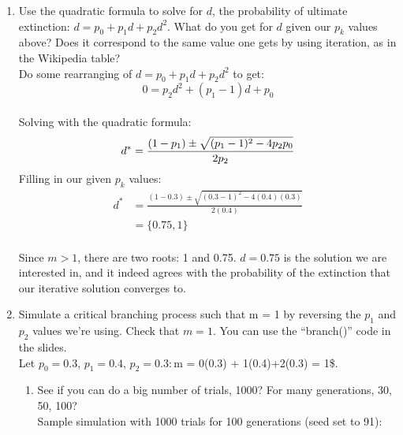 \documentclass[]{book}
\providecommand{\tightlist}{%
  \setlength{\itemsep}{0pt}\setlength{\parskip}{0pt}}
\begin{document}
\begin{enumerate}
\def\labelenumi{\arabic{enumi}.}
\setcounter{enumi}{3}
\tightlist
\item
  Use the quadratic formula to solve for \(d\), the probability of ultimate extinction: \(d = p_0 + p_1d + p_2d^2\). What do you get for \(d\) given our \(p_k\) values above? Does it correspond to the same value one gets by using iteration, as in the Wikipedia table?\\
  Do some rearranging of \(d = p_0 + p_1d + p_2d^2\) to get: \[0 = p_2d^2 +(p_1-1)d + p_0  \]\\
  Solving with the quadratic formula: \[ d^* = {(1-p_1) \pm \sqrt{(p_1-1)^2 - 4p_2p_0}  \over 2p_2 } \]
  Filling in our given \(p_k\) values:
  \[\begin{aligned}
   d^* &= \frac{(1-0.3) \pm \sqrt{(0.3-1)^2 -4(0.4)(0.3)}}{2(0.4)} \\
   &= \{0.75, 1\} 
   \end{aligned}\]\\
  Since \(m>1\), there are two roots: 1 and 0.75. \(d=0.75\) is the solution we are interested in, and it indeed agrees with the probability of the extinction that our iterative solution converges to.
\item
  Simulate a critical branching process such that m = 1 by reversing the \(p_1\) and \(p_2\) values we're using. Check that \(m = 1\). You can use the ``branch()'' code in the slides.\\
  Let \(p_0=0.3\), \(p_1 =0.4\), \(p_2=0.3:\)m = 0(0.3) + 1(0.4)+2(0.3) = 1\$.

  \begin{enumerate}
  \def\labelenumii{\alph{enumii}.}
  \tightlist
  \item
    See if you can do a big number of trials, 1000? For many generations, 30, 50, 100?\\
    Sample simulation with 1000 trials for 100 generations (seed set to 91):


\end{enumerate}
\end{enumerate}
\end{document}
